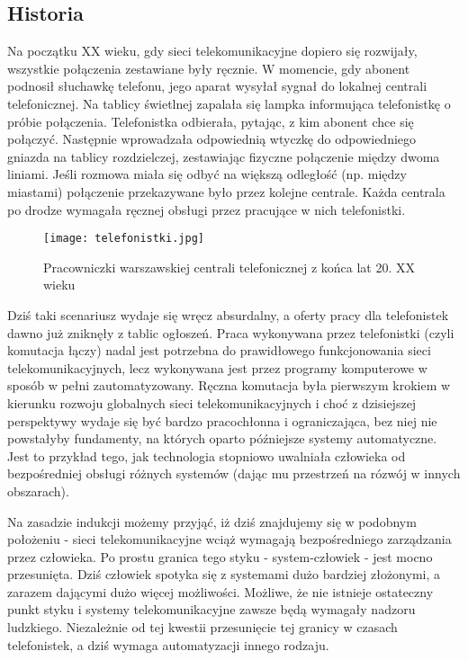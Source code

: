\subsection{Historia}

Na początku XX wieku, gdy sieci telekomunikacyjne dopiero się rozwijały, wszystkie połączenia zestawiane były ręcznie. W momencie, gdy abonent podnosił słuchawkę telefonu, jego aparat wysyłał sygnał do lokalnej centrali telefonicznej. Na tablicy świetlnej zapalała się lampka informująca telefonistkę o próbie połączenia. Telefonistka odbierała, pytając, z kim abonent chce się połączyć. Następnie wprowadzała odpowiednią wtyczkę do odpowiedniego gniazda na tablicy rozdzielczej, zestawiając fizyczne połączenie między dwoma liniami. Jeśli rozmowa miała się odbyć na większą odległość (np. między miastami) połączenie przekazywane było przez kolejne centrale. Każda centrala po drodze wymagała ręcznej obsługi przez pracujące w nich telefonistki. 

\begin{figure}[!htbp]
    \centering \texttt{[image: telefonistki.jpg]}
    \caption{Pracowniczki warszawskiej centrali telefonicznej z końca lat 20. XX wieku}\label{fig:telefonistki}
\end{figure}

Dziś taki scenariusz wydaje się wręcz absurdalny, a oferty pracy dla telefonistek dawno już zniknęły z tablic ogłoszeń. Praca wykonywana przez telefonistki (czyli komutacja łączy) nadal jest potrzebna do prawidłowego funkcjonowania sieci telekomunikacyjnych, lecz wykonywana jest przez programy komputerowe w sposób w pełni zautomatyzowany. Ręczna komutacja była pierwszym krokiem w kierunku rozwoju globalnych sieci telekomunikacyjnych i choć z dzisiejszej perspektywy wydaje się być bardzo pracochłonna i ograniczająca, bez niej nie powstałyby fundamenty, na których oparto późniejsze systemy automatyczne. Jest to przykład tego, jak technologia stopniowo uwalniała człowieka od bezpośredniej obsługi różnych systemów (dając mu przestrzeń na rózwój w innych obszarach). 

Na zasadzie indukcji możemy przyjąć, iż dziś znajdujemy się w podobnym położeniu - sieci telekomunikacyjne wciąż wymagają bezpośredniego zarządzania przez człowieka. Po prostu granica tego styku - system-człowiek - jest mocno przesunięta. Dziś człowiek spotyka się z systemami dużo bardziej złożonymi, a zarazem dającymi dużo więcej możliwości. Możliwe, że nie istnieje ostateczny punkt styku i systemy telekomunikacyjne zawsze będą wymagały nadzoru ludzkiego. Niezależnie od tej kwestii przesunięcie tej granicy w czasach telefonistek, a dziś wymaga automatyzacji innego rodzaju. 

